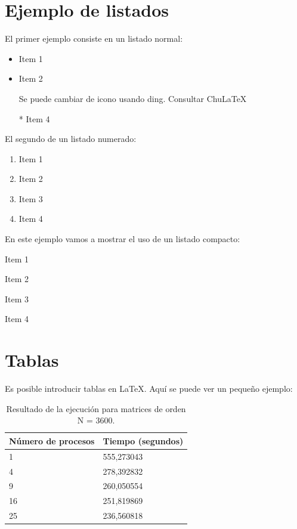 \documentclass[11pt]{article}
\begin{document}
\section{Ejemplo de listados}

El primer ejemplo consiste en un listado normal:
\begin{itemize}
	\item Item 1
	\item Item 2
	\item[\ding{108}] Se puede cambiar de icono usando ding. Consultar ChuLaTeX \cite{Salido2011}
	\item[*] Item 4 
\end{itemize}

El segundo de un listado numerado:
\begin{enumerate}
	\item Item 1
	\item Item 2
	\item Item 3
	\item Item 4
\end{enumerate}

En este ejemplo vamos a mostrar el uso de un listado compacto:

\begin{compactitem}
	\item Item 1
	\item Item 2
	\item Item 3
	\item Item 4
\end{compactitem}


\section{Tablas}
Es posible introducir tablas en \LaTeX{}. Aquí se puede ver un pequeño ejemplo:

\begin{table}[htbp]
	\begin{center}
		\begin{tabular}{|l|l|}
			\hline
			Número de procesos & Tiempo (segundos) \\
			\hline \hline
			1 & 555,273043 \\ \hline
			4 & 278,392832 \\ \hline
			9 & 260,050554 \\ \hline
			16 & 251,819869 \\ \hline
			25 & 236,560818 \\ \hline
		\end{tabular}
		\caption{Resultado de la ejecución para matrices de orden N = 3600.}
		\label{tabla:Tiempos3600}
	\end{center}
\end{table}
\end{document}
